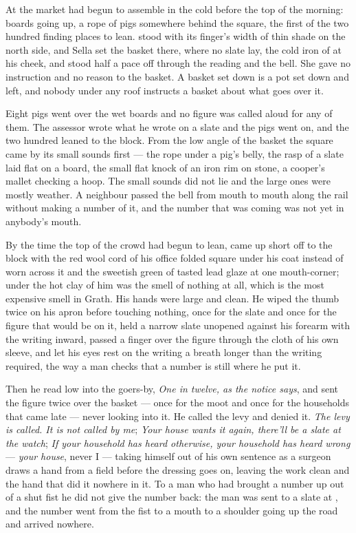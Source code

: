 At  the market had begun to assemble in the cold before the top of the morning: boards going up, a rope of pigs somewhere behind the square, the first of the two hundred finding places to lean.  stood with its finger's width of thin shade on the north side, and Sella set the basket there, where no slate lay, the cold iron of  at his cheek, and stood half a pace off through the reading and the bell. She gave no instruction and no reason to the basket. A basket set down is a pot set down and left, and nobody under any roof instructs a basket about what goes over it.

\scenebreak

Eight pigs went over the wet boards and no figure was called aloud for any of them. The assessor wrote what he wrote on a slate and the pigs went on, and the two hundred leaned to the block. From the low angle of the basket the square came by its small sounds first --- the rope under a pig's belly, the rasp of a slate laid flat on a board, the small flat knock of an iron rim on stone, a cooper's mallet checking a hoop. The small sounds did not lie and the large ones were mostly weather. A neighbour passed the bell from mouth to mouth along the rail without making a number of it, and the number that was coming was not yet in anybody's mouth.

By the time the top of the crowd had begun to lean,  came up short off  to the block with the red wool cord of his office folded square under his coat instead of worn across it and the sweetish green of tasted lead glaze at one mouth-corner; under the hot clay of him was the smell of nothing at all, which is the most expensive smell in Grath. His hands were large and clean. He wiped the thumb twice on his apron before touching nothing, once for the slate and once for the figure that would be on it, held a narrow slate unopened against his forearm with the writing inward, passed a finger over the figure through the cloth of his own sleeve, and let his eyes rest on the writing a breath longer than the writing required, the way a man checks that a number is still where he put it.

Then he read low into the goers-by, \emph{One in twelve, as the notice says}, and sent the figure twice over the basket --- once for the moot and once for the households that came late --- never looking into it. He called the levy and denied it. \emph{The levy is called. It is not called by me}; \emph{Your house wants it again, there'll be a slate at the watch}; \emph{If your household has heard otherwise, your household has heard wrong} --- \emph{your house}, never I --- taking himself out of his own sentence as a surgeon draws a hand from a field before the dressing goes on, leaving the work clean and the hand that did it nowhere in it. To a man who had brought a number up out of a shut fist he did not give the number back: the man was sent to a slate at , and the number went from the fist to a mouth to a shoulder going up the road and arrived nowhere.

